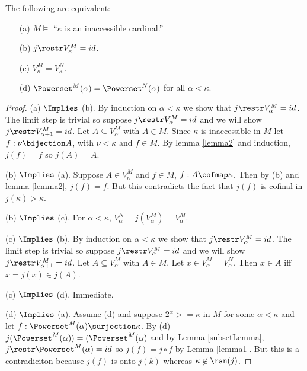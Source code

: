 \documentclass[oneside,12pt]{amsart}
\begin{document}
\begin{lemma}
\label{equivalence1}
The following are equivalent:
\begin{itemize}
\item[(a)] $M\models$ ``$\kappa$ is an inaccessible cardinal.''

\item[(b)] $j\restr V^{M}_{\kappa} = id$.

\item[(c)] $V^{M}_{\kappa} = V^{N}_{\kappa}$.

\item[(d)] $\Powerset^{M}(\alpha) = \Powerset^{N}(\alpha)$ for all $\alpha < \kappa$.
\end{itemize}
\end{lemma}
\begin{proof}
(a) $\Implies$ (b). By induction on $\alpha < \kappa$ we show that $j\restr V^{M}_{\alpha} = id$.
The limit step is trivial so suppose $j\restr V^{M}_{\alpha} = id$ and we will show
$j\restr V^{M}_{\alpha + 1} = id$. Let $A\subseteq V^{M}_{\alpha}$ with $A\in M$.
Since $\kappa$ is inaccessible in $M$ let $f:\nu\bijection A$, with $\nu < \kappa$ and
$f\in M$. By lemma \ref{lemma2} and induction, $j(f) = f$ so $j(A) = A$.

(b) $\Implies$ (a). Suppose $A\in V^{M}_{\kappa}$ and $f\in M$, $f:A \cofmap \kappa$. Then
by (b) and lemma \ref{lemma2}, $j(f) = f$. But this contradicts the fact that $j(f)$
is cofinal in $j(\kappa) > \kappa$.

(b) $\Implies$ (c). For $\alpha < \kappa$,  $V^{N}_{\alpha} = j(V^{M}_{\alpha}) = V^{M}_{\alpha}$.

(c) $\Implies$ (b). By induction on $\alpha < \kappa$ we show that $j\restr V^{M}_{\alpha} = id$.
The limit step is trivial so suppose $j\restr V^{M}_{\alpha} = id$ and we will show
$j\restr V^{M}_{\alpha + 1} = id$. Let $A\subseteq V^{M}_{\alpha}$ with $A\in M$.
Let $x \in V^{M}_{\alpha} = V^{N}_{\alpha}$. Then $x\in A$ iff $x = j(x) \in j(A)$.

(c) $\Implies$ (d). Immediate.

(d) $\Implies$ (a). Assume (d) and suppose $2^\alpha >= \kappa$ in $M$ for some
$\alpha < \kappa$ and let $f:\Powerset^{M}(\alpha) \surjection \kappa$. By (d)
$j(\Powerset^{M}(\alpha)) = (\Powerset^{M}(\alpha)$ and by Lemma \ref{subsetLemma},
$j\restr \Powerset^{M}(\alpha) = id$  so $j(f) = j \circ f$
by Lemma \ref{lemma1}. But this is a contradiciton because $j(f)$ is onto $j(k)$
whereas $\kappa \not\in\ran(j)$.
\end{proof}
\end{document}
